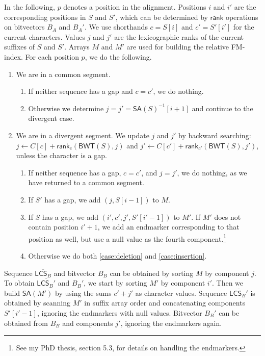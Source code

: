 \documentclass[11pt,a4paper]{article}
\newcommand{\BWT}
  {\ensuremath{\mathsf{BWT}}}
\newcommand{\SA}
  {\ensuremath{\mathsf{SA}}}
\newcommand{\LCS}
  {\ensuremath{\mathsf{LCS}}}
\newcommand{\mrank}{\ensuremath{\mathsf{rank}}}
\begin{document}
In the following, $p$ denotes a position in the alignment. Positions $i$ and $i'$ are the corresponding positions in $S$ and $S'$, which can be determined by $\mrank$ operations on bitvectors $B_{A}$ and $B_{A}'$. We use shorthands $c = S[i]$ and $c' = S'[i']$ for the current characters. Values $j$ and $j'$ are the lexicographic ranks of the current suffixes of $S$ and $S'$. Arrays $M$ and $M'$ are used for building the relative FM-index. For each position $p$, we do the following.

\begin{enumerate}

\item We are in a common segment.
\begin{enumerate}
\item If neither sequence has a gap and $c = c'$, we do nothing.
\item Otherwise we determine $j = j' = \SA(S)^{-1}[i + 1]$ and continue to the divergent case.
\end{enumerate}

\item We are in a divergent segment. We update $j$ and $j'$ by backward searching: $j \leftarrow C[c] + \mrank_{c}(\BWT(S), j)$ and $j' \leftarrow C[c'] + \mrank_{c'}(\BWT(S), j')$, unless the character is a gap.
\begin{enumerate}
\item If neither sequence has a gap, $c = c'$, and $j = j'$, we do nothing, as we have returned to a common segment.
\item If $S'$ has a gap, we add $(j, S[i-1])$ to $M$.\label{case:deletion}
\item If $S$ has a gap, we add $(i', c', j', S'[i'-1])$ to $M'$. If $M'$ does not contain position $i'+1$, we add an endmarker corresponding to that position as well, but use a null value as the fourth component.\footnote{See my PhD thesis, section 5.3, for details on handling the endmarkers.}\label{case:insertion}
\item Otherwise we do both \ref{case:deletion} and \ref{case:insertion}.
\end{enumerate}

\end{enumerate}

Sequence $\overline{\LCS_{B}}$ and bitvector $B_{B}$ can be obtained by sorting $M$ by component $j$. To obtain $\overline{\LCS_{B}'}$ and $B_{B}'$, we start by sorting $M'$ by component $i'$. Then we build $\SA(M')$ by using the sums $c'+j'$ as character values. Sequence $\overline{\LCS_{B}'}$ is obtained by scanning $M'$ in suffix array order and concatenating components $S'[i'-1]$, ignoring the endmarkers with null values. Bitvector $B_{B}'$ can be obtained from $B_{B}$ and components $j'$, ignoring the endmarkers again.
\end{document}
